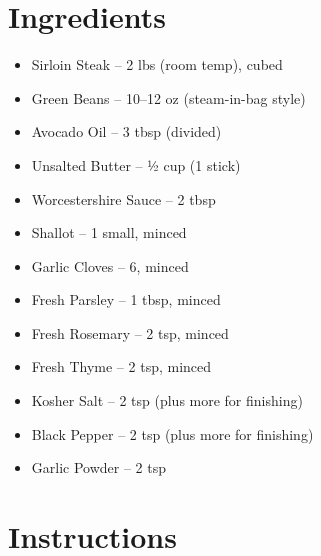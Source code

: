 




\section*{Ingredients}

\begin{itemize}
      \item[\cut] Sirloin Steak – 2 lbs (room temp), cubed
      \item Green Beans – 10–12 oz (steam-in-bag style)
      \item[\measure] Avocado Oil – 3 tbsp (divided)
      \item Unsalted Butter – ½ cup (1 stick)
      \item[\measure] Worcestershire Sauce – 2 tbsp
      \item[\cut] Shallot – 1 small, minced
      \item[\cut] Garlic Cloves – 6, minced
      \item[\cut] Fresh Parsley – 1 tbsp, minced
      \item[\cut] Fresh Rosemary – 2 tsp, minced
      \item[\cut] Fresh Thyme – 2 tsp, minced
      \item[\measure] Kosher Salt – 2 tsp (plus more for finishing)
      \item[\measure] Black Pepper – 2 tsp (plus more for finishing)
      \item[\measure] Garlic Powder – 2 tsp
\end{itemize}

\newpage
{}
\section*{Instructions}

